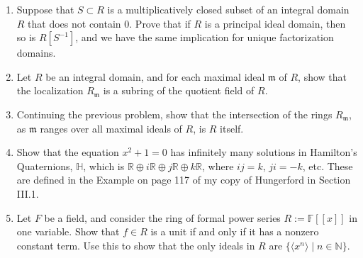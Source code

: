 \documentclass[12pt]{article}
\newcommand{\HH}{{\mathbb H}}
\newcommand{\FF}{{\mathbb F}}
\newcommand{\RR}{{\mathbb R}}
\newcommand{\NN}{{\mathbb N}}
\begin{document}
\begin{enumerate}

\item Suppose that $S\subset R$ is a multiplicatively closed subset of an integral domain $R$ that does not contain $0$.
       Prove that if $R$ is a principal ideal domain, then so is $R[S^{-1}]$, and we have the same implication for unique
       factorization domains.
   \vspace{-2pt} 

\item Let $R$ be an integral domain, and for each  maximal ideal $\mathfrak{m}$ of $R$, show that the localization
  $R_{\mathfrak m}$ is a subring of the quotient field of $R$.\vspace{-2pt}


\item Continuing the previous problem, show that the intersection of the rings $R_{\mathfrak m}$, as ${\mathfrak m}$
  ranges over all maximal ideals of $R$, is $R$ itself.\vspace{-2pt}


 
\item Show that the equation $x^2+1=0$ has infinitely many solutions in Hamilton's Quaternions,
       $\HH$, which is $\RR\oplus i\RR\oplus j\RR\oplus k\RR$, where $ij=k$, $ji=-k$, etc.
       These are defined in the Example on page 117 of my copy of Hungerford in Section III.1.\vspace{-2pt}


\item Let $F$ be a field, and consider the ring of formal power series $R:=\FF[[x]]$ in one variable.
      Show that $f\in R$ is a unit if and only if it has a nonzero constant term.
       Use this to show that the only ideals in $R$ are $\{ \langle x^n\rangle\mid n\in \NN\}$.\vspace{-2pt}


\end{enumerate}
\end{document}
